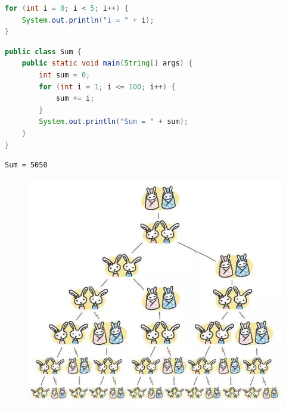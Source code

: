 \begin{lstlisting}[language=Java]
for (int i = 0; i < 5; i++) {
    System.out.println("i = " + i);
}
\end{lstlisting}

\vspace{0.5cm}


\begin{lstlisting}[language=Java]
public class Sum {
    public static void main(String[] args) {
        int sum = 0;
        for (int i = 1; i <= 100; i++) {
            sum += i;
        }
        System.out.println("Sum = " + sum);
    }
} 
\end{lstlisting}

\begin{tcolorbox}
    \begin{verbatim}
Sum = 5050
\end{verbatim}
\end{tcolorbox}

\vspace{0.5cm}


\begin{figure}[H]
    \centering
    \includegraphics[scale=0.5]{img/Chapter3/3-2/1.png}
\end{figure}

